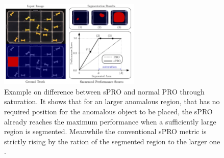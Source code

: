 \begin{figure}[H]
    \centering
    \includegraphics[width=0.6\textwidth]{figures/spro_vs_pro_bergmann.png}
    \caption{Example on difference between sPRO and normal PRO through saturation. It shows that for an larger anomalous region, that has no required 
             position for the anomalous object to be placed, the sPRO already reaches the maximum performance when a sufficiently large 
             region is segmented. Meanwhile the conventional sPRO metric is strictly rising by the ration of the segmented region to the larger one \cite{LOCODentsAndScratchesBergmann2022}.}
    \label{fig:sprovspro}
\end{figure}



